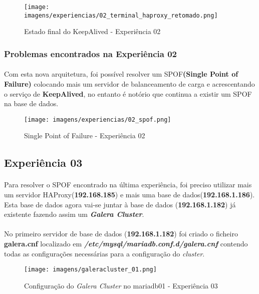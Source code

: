 \documentclass{report}
\begin{document}
\begin{figure}[H]
\center
\texttt{[image: imagens/experiencias/02\_terminal\_haproxy\_retomado.png]}
\caption{Estado final do KeepAlived - Experiência 02}
\label{fig.nav}
\end{figure}

\subsubsection{Problemas encontrados na Experiência 02}
\paragraph{}
Com esta nova arquitetura, foi possível resolver um SPOF\textbf{(Single Point of Failure)} colocando mais um servidor de balanceamento de carga e acrescentando o serviço de \textbf{KeepAlived}, no entanto é notório que continua a existir um SPOF na base de dados.

\begin{figure}[H]
\center
\texttt{[image: imagens/experiencias/02\_spof.png]}
\caption{Single Point of Failure - Experiência 02}
\label{fig.nav}
\end{figure}


\subsection{Experiência 03}
\paragraph{}
Para resolver o SPOF encontrado na última experiência, foi preciso utilizar mais um servidor HAProxy(\textbf{192.168.185}) e mais uma base de dados(\textbf{192.168.1.186}). Esta base de dados agora vai-se juntar à base de dados (\textbf{192.168.1.182}) já existente fazendo assim um \textbf{\emph{Galera Cluster}}.

\paragraph{}
No primeiro servidor de base de dados (\textbf{192.168.1.182}) foi criado o ficheiro \textbf{galera.cnf} localizado em \textbf{\emph{/etc/mysql/mariadb.conf.d/galera.cnf}} contendo todas as configurações necessárias para a configuração do \emph{cluster}.


\begin{figure}[H]
\center
\texttt{[image: imagens/galeracluster\_01.png]}
\caption{Configuração do \emph{Galera Cluster} no mariadb01 - Experiência 03}
\label{fig.nav}
\end{figure}
\end{document}
